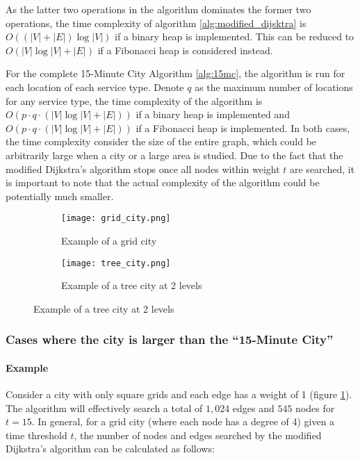 As the latter two operations in the algorithm dominates the former two operations, the time complexity of algorithm \ref{alg:modified_dijsktra} is $O((|V|+|E|)\log |V|)$ if a binary heap is implemented. This can be reduced to $O(|V|\log |V|+|E|)$ if a Fibonacci heap is considered instead.

For the complete 15-Minute City Algorithm \ref{alg:15mc}, the algorithm is run for each location of each service type. Denote $q$ as the maximum number of locations for any service type, the time complexity of the algorithm is $O(p\cdot q\cdot(|V|\log |V|+|E|))$ if a binary heap is implemented and $O(p\cdot q\cdot(|V|\log |V|+|E|))$ if a Fibonacci heap is implemented. In both cases, the time complexity consider the size of the entire graph, which could be arbitrarily large when a city or a large area is studied. Due to the fact that the modified Dijkstra's algorithm stops once all nodes within weight $t$ are searched, it is important to note that the actual complexity of the algorithm could be potentially much smaller.

\begin{figure}[H]
    \centering
    \begin{subfigure}{0.5\textwidth}
        \centering
        \texttt{[image: grid\_city.png]}
        \caption{Example of a grid city}
        \label{fig:grid_city}
    \end{subfigure}\hfill
    \begin{subfigure}{0.5\textwidth}
        \centering
        \texttt{[image: tree\_city.png]}
        \caption{Example of a tree city at 2 levels}
        \label{fig:tree_city}
    \end{subfigure}
\end{figure}

\subsubsection{Cases where the city is larger than the ``15-Minute City''}

\paragraph{Example}

Consider a city with only square grids and each edge has a weight of 1 (figure \ref{fig:grid_city}). The algorithm will effectively search a total of $1,024$ edges and $545$ nodes for $t=15$. In general, for a grid city (where each node has a degree of 4) given a time threshold $t$, the number of nodes and edges searched by the modified Dijkstra's algorithm can be calculated as follows:

